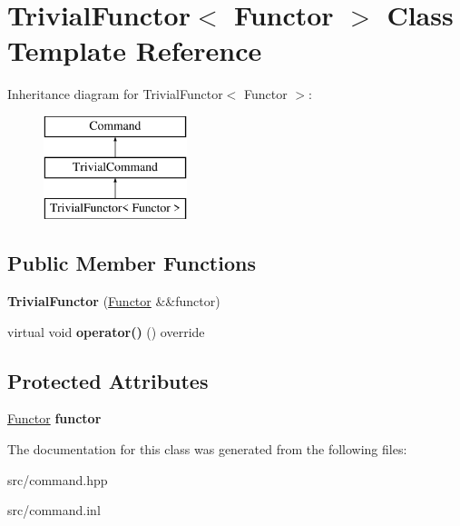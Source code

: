 \hypertarget{class_trivial_functor}{}\section{Trivial\+Functor$<$ Functor $>$ Class Template Reference}
\label{class_trivial_functor}
Inheritance diagram for Trivial\+Functor$<$ Functor $>$\+:\begin{figure}[H]
\begin{center}
\leavevmode
\includegraphics[height=3.000000cm]{class_trivial_functor}
\end{center}
\end{figure}
\subsection*{Public Member Functions}
\begin{DoxyCompactItemize}
\item 
\mbox{\label{class_trivial_functor_ab5798bb2ea9fcdb5bf910662ac49c34c}} 
{\bfseries Trivial\+Functor} (\mbox{\hyperlink{class_functor}{Functor}} \&\&functor)
\item 
\mbox{\label{class_trivial_functor_a5f9b8d18c11a057c2b3e97703262d1e9}} 
virtual void {\bfseries operator()} () override
\end{DoxyCompactItemize}
\subsection*{Protected Attributes}
\begin{DoxyCompactItemize}
\item 
\mbox{\label{class_trivial_functor_a293617a9f9c35365e37237183c7e6fac}} 
\mbox{\hyperlink{class_functor}{Functor}} {\bfseries functor}
\end{DoxyCompactItemize}


The documentation for this class was generated from the following files\+:\begin{DoxyCompactItemize}
\item 
src/command.\+hpp\item 
src/command.\+inl\end{DoxyCompactItemize}
